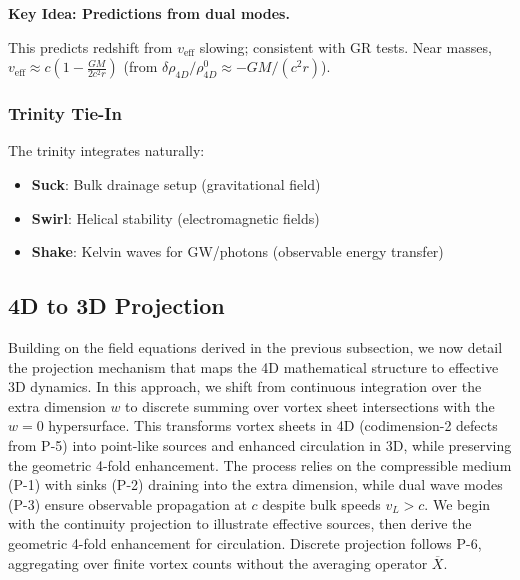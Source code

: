 \textbf{Key Idea: Predictions from dual modes.}

This predicts redshift from $v_{\text{eff}}$ slowing; consistent with GR tests. Near masses, $v_{\text{eff}} \approx c \left(1 - \frac{G M}{2 c^2 r}\right)$ (from $\delta \rho_{4D} / \rho_{4D}^0 \approx - G M / (c^2 r)$).

\subsubsection{Trinity Tie-In}

The trinity integrates naturally:
\begin{itemize}
\item \textbf{Suck}: Bulk drainage setup (gravitational field)
\item \textbf{Swirl}: Helical stability (electromagnetic fields)
\item \textbf{Shake}: Kelvin waves for GW/photons (observable energy transfer)
\end{itemize}


\subsection{4D to 3D Projection}

Building on the field equations derived in the previous subsection, we now detail the projection mechanism that maps the 4D mathematical structure to effective 3D dynamics. In this approach, we shift from continuous integration over the extra dimension $w$ to discrete summing over vortex sheet intersections with the $w=0$ hypersurface. This transforms vortex sheets in 4D (codimension-2 defects from P-5) into point-like sources and enhanced circulation in 3D, while preserving the geometric 4-fold enhancement. The process relies on the compressible medium (P-1) with sinks (P-2) draining into the extra dimension, while dual wave modes (P-3) ensure observable propagation at $c$ despite bulk speeds $v_L > c$. We begin with the continuity projection to illustrate effective sources, then derive the geometric 4-fold enhancement for circulation. Discrete projection follows P-6, aggregating over finite vortex counts without the averaging operator $\overline{X}$.

